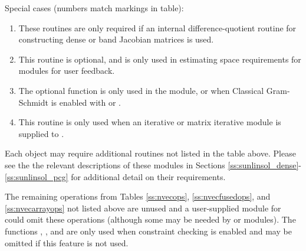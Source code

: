 Special cases (numbers match markings in table):
\begin{enumerate}
\item These routines are only required if an internal
  difference-quotient routine for constructing dense or band
  Jacobian matrices is used.
\item This routine is optional, and is only used in estimating
  space requirements for {\cvodes} modules for user feedback.
\item The optional function  is only used in the
  {\sunnonlinsolfixedpoint} module, or when Classical Gram-Schmidt is
  enabled with {\spgmr} or {\spfgmr}.
\item This routine is only used when an iterative or matrix iterative
  {\sunlinsol} module is supplied to {\cvodes}.
\end{enumerate}

Each {\sunlinsol} object may require additional {\nvector} routines
not listed in the table above.  Please see the the relevant
descriptions of these modules in Sections
\ref{ss:sunlinsol_dense}-\ref{ss:sunlinsol_pcg} for additional detail
on their {\nvector} requirements.

The remaining operations from Tables \ref{ss:nvecops}, \ref{ss:nvecfusedops}, and
\ref{ss:nvecarrayops} not listed above
are unused and a user-supplied {\nvector} module for {\cvodes} could
omit these operations (although some may be needed by {\sunnonlinsol}
or {\sunlinsol} modules).  The functions ,
, and  are only used when
constraint checking is enabled and may be omitted if this feature is
not used.

















